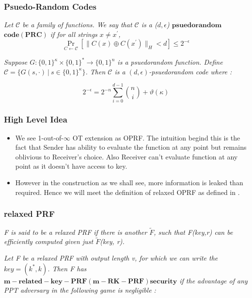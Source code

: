\documentclass[hyperref={pdfpagelabels=false}]{beamer}
\theoremstyle{remark}
\begin{document}
\begin{frame}
\frametitle{Psuedo-Random Codes}
\begin{definition}[2]
\textit{Let $\mathcal{C}$ be a family of functions. We say that $\mathcal{C}$ is a ($d,\epsilon$) $\mathbf{psuedorandom}$ $\mathbf{code(PRC)}$ if for all strings $x \neq x^\prime$,}
\begin{equation*}
\Pr_{C\leftarrow \mathcal{C}} \left[ \|C(x) \oplus C(x^\prime)\|_H < d \right] \leq 2^{-\epsilon}
\end{equation*}
\end{definition}\pause

\begin{lemma}[1]
\textit{Suppose $G : \{0,1\}^\kappa \times \{0,1\}^* \rightarrow \{0,1\}^n$ is a psuedorandom function. Define $\mathcal{C} = \{G(s,\cdot) \  | \ s \in \{0,1\}^\kappa\}$. Then $\mathcal{C}$ is a $(d,\epsilon)$-psuedorandom code where : }

\begin{equation*}
2^{-\epsilon} = 2^{-n}\sum_{i=0}^{d-1} {n \choose i} + \vartheta(\kappa)
\end{equation*}
\end{lemma}
\end{frame}

\begin{frame}
\frametitle{High Level Idea}
\begin{itemize}
\item We see 1-out-of-$\infty$ OT extension as OPRF. The intuition begind this is the fact that Sender has ability to  evaluate the function at any point but remains oblivious to Receiver's choice. Also Receiver can't evaluate function at any point as it doesn't have access to key.\pause

\item However in the construction as we shall see, more information is leaked than required. Hence we will meet the definition of \textsf{relaxed OPRF} as defined in \cite{FIPR}.

\end{itemize}
\end{frame}

\begin{frame}
\frametitle{relaxed PRF}
\begin{definition}[3]
\textit{F is said to be a \textsf{relaxed PRF} if there is another $\widetilde{F}$, such that F(key,r) can be efficiently computed given just $\widetilde{F}$(key, r).}
\end{definition}\pause

\begin{definition}[4]
\textit{Let F be a relaxed PRF with output length v, for which we can write the $key = (k^*,k)$. Then F has $\mathbf{m-related-key-PRF (m-RK-PRF) security}$ if the advantage of any PPT adversary in the following game is negligible :
}
\end{definition}
\end{frame}
\end{document}

